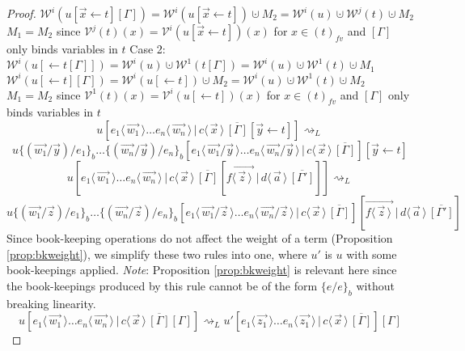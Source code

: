 \documentclass[a4paper,UKenglish,cleveref, autoref]{lipics-v2019}
\newcommand{\fv}[1]{(#1)_{fv}}
\newcommand{\share}[3]{#1 [#2 \leftarrow #3]}
\newcommand{\dist}[5]{#1 [ #2 \, \vert \, \fakedist{#4}{#5} \, #3 ]}
\newcommand{\fakedist}[2]{#1 \langle \, #2 \, \rangle}
\newcommand{\vecdist}[2]{\overrightarrow{\fakedist{#1}{#2} \,}}
\newcommand{\psub}[3]{#1 \{ #2 / #3 \}_{b}}
\newcommand{\weight}[2]{\mathcal{W}^{#1}(#2)}
\newcommand{\weightvar}[2]{\mathcal{V}^{#1}(#2)}
\begin{document}
\begin{proof}
$\weight{i}{\share{u}{\vec{x}}{t}[\Gamma]} = \weight{i}{\share{u}{\vec{x}}{t}} \cupdot M_{2} = \weight{i}{u} \cupdot \weight{j}{t} \cupdot M_{2}$
\newline
$M_{1} = M_{2}$ since $\weightvar{j}{t}(x) = \weightvar{i}{\share{u}{\vec{x}}{t}}(x)$ for $x \in \fv{t}$ and $[\Gamma]$ only binds variables in $t$
\newline
Case 2:
\newline
$\weight{i}{\share{u}{}{t[\Gamma]}} = \weight{i}{u} \cupdot \weight{1}{t[\Gamma]} = \weight{i}{u} \cupdot \weight{1}{t} \cupdot M_{1}$
\newline
$\weight{i}{\share{u}{}{t}[\Gamma]} = \weight{i}{\share{u}{}{t}} \cupdot M_{2} = \weight{i}{u} \cupdot \weight{1}{t} \cupdot M_{2}$
\newline
$M_{1} = M_{2}$ since $\weightvar{1}{t}(x) = \weightvar{i}{\share{u}{}{t}}(x)$ for $x \in \fv{t}$ and  $[\Gamma]$ only binds variables in $t$
\newline
$$\dist{u}{\fakedist{e_{1}}{\vec{w_{1}}} \dots \fakedist{e_{n}}{\vec{w_{n}}}}{\overline{[\Gamma]} \share{}{\vec{y}}{t}}{c}{\vec{x}} \rightsquigarrow_{L}$$
$$\dist{\psub{ \psub{u}{(\vec{w_{1}} / \vec{y})}{e_{1}} \dots}{(\vec{w_{n}} / \vec{y})}{e_{n}}}{\fakedist{e_{1}}{\vec{w_{1}} / \vec{y}} \dots \fakedist{e_{n}}{\vec{w_{n}} / \vec{y}}}{\overline{[\Gamma]}}{c}{\vec{x}} \share{}{\vec{y}}{t}$$
\newline
$$\dist{u}{\fakedist{e_{1}}{\vec{w_{1}}} \dots \fakedist{e_{n}}{\vec{w_{n}}}}{\overline{[\Gamma]} \dist{}{\vecdist{f}{\vec{z}}}{\overline{[\Gamma']}}
{d}{\vec{a}}}{c}{\vec{x}} \rightsquigarrow_{L}$$
$$\dist{\psub{ \psub{u}{(\vec{w_{1}} / \vec{z})}{e_{1}} \dots}{(\vec{w_{n}} / \vec{z})}{e_{n}}}{\fakedist{e_{1}}{\vec{w_{1}} / \vec{z}} \dots \fakedist{e_{n}}{\vec{w_{n}} / \vec{z}}}{\overline{[\Gamma]}}{c}{\vec{x}}  \dist{}{\vecdist{f}{\vec{z}}}{\overline{[\Gamma']}}{d}{\vec{a}}$$
Since book-keeping operations do not affect the weight of a term (Proposition \ref{prop:bkweight}), we simplify these two rules into one, where $u'$ is $u$ with some book-keepings applied.
\newline
\emph{Note}: Proposition \ref{prop:bkweight} is relevant here since the book-keepings produced by this rule cannot be of the form $\psub{}{e}{e}$ without breaking linearity.
$$\dist{u}{\fakedist{e_{1}}{\vec{w_{1}}} \dots \fakedist{e_{n}}{\vec{w_{n}}}}{\overline{[\Gamma]} [\Gamma]}{c}{\vec{x}} \rightsquigarrow_{L}\dist{u'}{\fakedist{e_{1}}{\vec{z_{1}}} \dots \fakedist{e_{n}}{\vec{z_{1}}}}{\overline{[\Gamma]}}{c}{\vec{x}}[\Gamma]$$

\end{proof}
\end{document}
